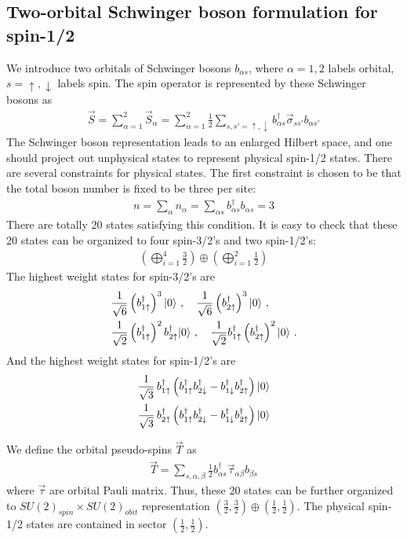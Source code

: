 \documentclass[%
 reprint,
 amsmath,amssymb,
 aps,
 pra, %
]{revtex4-1}
\newcommand{\dg}{\dagger}
\begin{document}
\subsection{Two-orbital Schwinger boson formulation for spin-1/2}
We introduce two orbitals of Schwinger bosons $b_{\alpha s}$, where $\alpha=1,2$ labels orbital, $s=\uparrow,\downarrow$ labels spin. 
The spin operator is represented by these Schwinger bosons as
\begin{align}
  \vec{S}=\sum_{\alpha=1}^2\vec{S}_\alpha=\sum_{\alpha=1}^2\frac{1}{2}\sum_{s,s'=\uparrow,\downarrow}b_{\alpha s}^\dg\vec{\sigma}_{ss'}b_{\alpha s'}
  \label{}
\end{align}
The Schwinger boson representation leads to an enlarged Hilbert space, and one should project out unphysical states to represent physical spin-1/2 states.
There are several constraints for physical states. 
The first constraint is chosen to be that the total boson number is fixed to be three per site:
\begin{align}
  n=\sum_{\alpha}n_\alpha=\sum_{\alpha s}b_{\alpha s}^\dg b_{\alpha s}=3
  \label{}
\end{align}
There are totally 20 states satisfying this condition.
It is easy to check that these 20 states can be organized to four spin-3/2's and two spin-1/2's: 
\begin{align}
  \left( \bigoplus_{i=1}^4\frac{3}{2} \right) \oplus \left(  \bigoplus_{i=1}^2\frac{1}{2} \right)
  \label{}
\end{align}
The highest weight states for spin-3/2's are
\begin{align}
  &\frac{1}{\sqrt{6}}\left(b_{1\uparrow}^\dg \right)^3|0\rangle~,\quad\frac{1}{\sqrt{6}}\left(b_{2\uparrow}^\dg \right)^3|0\rangle~,\notag\\
  &\frac{1}{\sqrt{2}}\left( b_{1\uparrow}^\dg \right)^2 b_{2\uparrow}^\dg|0\rangle~,\quad \frac{1}{\sqrt{2}}b_{1\uparrow}^\dg \left(b_{2\uparrow}^\dg\right)^2|0\rangle~. 
  \label{}
\end{align}
And the highest weight states for spin-1/2's are
\begin{align}
  \frac{1}{\sqrt{3}}\,b_{1\uparrow}^\dg\left( b_{1\uparrow}^\dg b_{2\downarrow}^\dg-b_{1\downarrow}^\dg b_{2\uparrow}^\dg \right)|0\rangle\notag\\
  \frac{1}{\sqrt{3}}\,b_{2\uparrow}^\dg\left( b_{1\uparrow}^\dg b_{2\downarrow}^\dg-b_{1\downarrow}^\dg b_{2\uparrow}^\dg \right)|0\rangle
  \label{}
\end{align}

We define the orbital pseudo-spins $\vec{T}$ as
\begin{align}
  \vec{T}=\sum_{s,\alpha,\beta}\frac{1}{2}b_{\alpha s}^\dg\vec{\tau}_{\alpha\beta}b_{\beta s}
  \label{}
\end{align}
where $\vec{\tau}$ are orbital Pauli matrix. 
Thus, these 20 states can be further organized to $SU(2)_{spin}\times SU(2)_{obit}$ representation $\left( \frac{3}{2},\frac{3}{2} \right)\oplus\left( \frac{1}{2},\frac{1}{2} \right)$.
The physical spin-1/2 states are contained in sector $\left( \frac{1}{2},\frac{1}{2} \right)$. 
\end{document}
